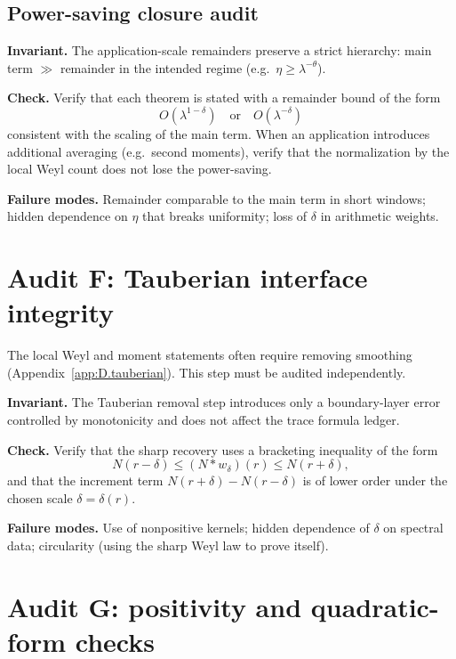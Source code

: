 \subsection{Power-saving closure audit}
\label{subsec:E.powersaving}

\begin{audit}
\label{audit:E.E2}
\textbf{Invariant.} The application-scale remainders preserve a strict hierarchy: main term $\gg$ remainder in the
intended regime (e.g.\ $\eta\ge \lambda^{-\theta}$).

\textbf{Check.} Verify that each theorem is stated with a remainder bound of the form
\[
O(\lambda^{1-\delta})
\quad\text{or}\quad
O(\lambda^{-\delta})
\]
consistent with the scaling of the main term.
When an application introduces additional averaging (e.g.\ second moments), verify that the normalization by the local
Weyl count does not lose the power-saving.

\textbf{Failure modes.} Remainder comparable to the main term in short windows; hidden dependence on $\eta$ that breaks
uniformity; loss of $\delta$ in arithmetic weights.
\end{audit}

\section{Audit F: Tauberian interface integrity}
\label{sec:E.audit.tauberian}

The local Weyl and moment statements often require removing smoothing (Appendix~\ref{app:D.tauberian}).
This step must be audited independently.

\begin{audit}
\label{audit:E.F1}
\textbf{Invariant.} The Tauberian removal step introduces only a boundary-layer error controlled by monotonicity and
does not affect the trace formula ledger.

\textbf{Check.} Verify that the sharp recovery uses a bracketing inequality of the form
\[
N(r-\delta)\le (N*w_\delta)(r)\le N(r+\delta),
\]
and that the increment term $N(r+\delta)-N(r-\delta)$ is of lower order under the chosen scale $\delta=\delta(r)$.

\textbf{Failure modes.} Use of nonpositive kernels; hidden dependence of $\delta$ on spectral data; circularity (using
the sharp Weyl law to prove itself).
\end{audit}

\section{Audit G: positivity and quadratic-form checks}
\label{sec:E.audit.positivity}

